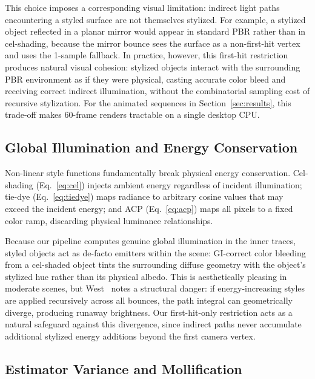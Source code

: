 \documentclass{article}
\begin{document}
This choice imposes a corresponding visual limitation: indirect light paths encountering a styled surface are not themselves stylized.
For example, a stylized object reflected in a planar mirror would appear in standard PBR rather than in cel-shading, because the mirror bounce sees the surface as a non-first-hit vertex and uses the 1-sample fallback.
In practice, however, this first-hit restriction produces natural visual cohesion: stylized objects interact with the surrounding PBR environment as if they were physical, casting accurate color bleed and receiving correct indirect illumination, without the combinatorial sampling cost of recursive stylization.
For the animated sequences in Section~\ref{sec:results}, this trade-off makes 60-frame renders tractable on a single desktop CPU.

\subsection{Global Illumination and Energy Conservation}

Non-linear style functions fundamentally break physical energy conservation.
Cel-shading (Eq.~\ref{eq:cel}) injects ambient energy regardless of incident illumination; tie-dye (Eq.~\ref{eq:tiedye}) maps radiance to arbitrary cosine values that may exceed the incident energy; and ACP (Eq.~\ref{eq:acp}) maps all pixels to a fixed color ramp, discarding physical luminance relationships.

Because our pipeline computes genuine global illumination in the inner traces, styled objects act as de-facto emitters within the scene: GI-correct color bleeding from a cel-shaded object tints the surrounding diffuse geometry with the object's stylized hue rather than its physical albedo.
This is aesthetically pleasing in moderate scenes, but West~\cite{west2024stylized} notes a structural danger: if energy-increasing styles are applied recursively across all bounces, the path integral can geometrically diverge, producing runaway brightness.
Our first-hit-only restriction acts as a natural safeguard against this divergence, since indirect paths never accumulate additional stylized energy additions beyond the first camera vertex.

\subsection{Estimator Variance and Mollification}
\end{document}

